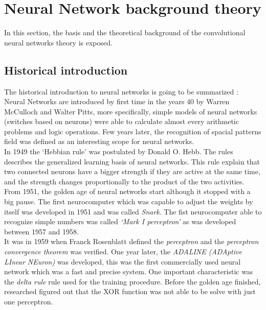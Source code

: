 \section{Neural Network background theory}
In this section, the basis and the theoretical background of the convolutional neural networks theory is exposed.\\

\subsection{Historical introduction}
The historical introduction to neural networks is going to be summarized \cite{BINN}:\\

Neural Networks are introduced by first time in the years 40 by Warren McCulloch and Walter Pitts, more specifically, simple models of neural networks (switches based on neurons) were able to calculate almost every arithmetic problems and logic operations. Few years later, the recognition of spacial patterns field was defined as an interesting scope for neural networks.\\

In 1949 the `Hebbian rule' was postulated by Donald O. Hebb. The rules describes the generalized learning basis of neural networks. This rule explain that two connected neurons have  a bigger strength if they are active at the same time, and the strength changes proportionally to the product of the two activities.\\

From 1951, the golden age of neural networks start although it stopped with a big pause. The first neurocomputer which was capable to adjust the weights by itself was developed in 1951 and was called \textit{Snark}. The fist neurocomputer able to recognize simple numbers was called \textit{`Mark I perceptron'} as was developed between 1957 and 1958.\\

It was in 1959 when Franck Rosenblatt  defined the \textit{perceptron} and the \textit{perceptron convergence theorem} was verified. One year later, the \textit{ADALINE (ADAptive LInear NEuron)} was developed, this was the first commercially used neural network which was a fast and precise system. One important characteristic was the \textit{delta rule} rule used for the training procedure. Before the golden age finished, researched figured out that the XOR function was not able to be solve with just one perceptron.\\

